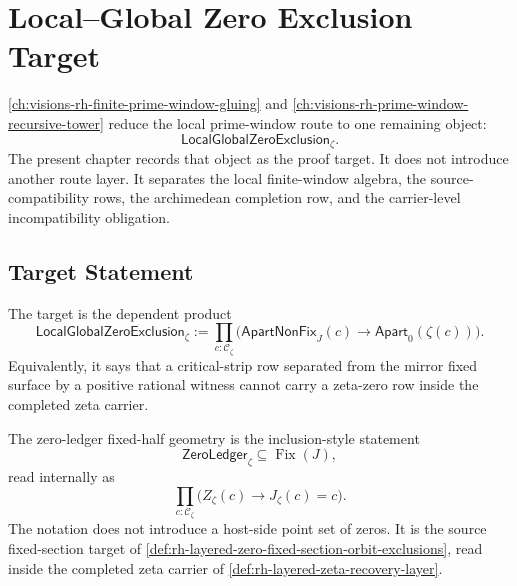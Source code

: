 \chapter{Local--Global Zero Exclusion Target}
\label{ch:visions-rh-local-global-zero-exclusion-target}

\autoref{ch:visions-rh-finite-prime-window-gluing} and
\autoref{ch:visions-rh-prime-window-recursive-tower} reduce the local
prime-window route to one remaining object:
$$
\mathsf{LocalGlobalZeroExclusion}_{\zeta}.
$$
The present chapter records that object as the proof target. It does not
introduce another route layer. It separates the local finite-window algebra,
the source-compatibility rows, the archimedean completion row, and the
carrier-level incompatibility obligation.

\section{Target Statement}
\label{sec:rh-local-global-zero-exclusion-target-statement}

\begin{definition}
\label{def:rh-local-global-zero-exclusion-target}
The target is the dependent product
$$
\mathsf{LocalGlobalZeroExclusion}_{\zeta}
:=
\prod_{c:\mathcal C_{\zeta}}
\bigl(
\mathsf{ApartNonFix}_{J}(c)
\to
\mathsf{Apart}_{0}(\zeta(c))
\bigr).
$$
Equivalently, it says that a critical-strip row separated from the mirror
fixed surface by a positive rational witness cannot carry a zeta-zero row
inside the completed zeta carrier.
\end{definition}

\begin{definition}
\label{def:rh-zero-ledger-fixed-half-geometry}
The zero-ledger fixed-half geometry is the inclusion-style statement
$$
\mathsf{ZeroLedger}_{\zeta}
\subseteq
\operatorname{Fix}(J),
$$
read internally as
$$
\prod_{c:\mathcal C_{\zeta}}
\bigl(
Z_{\zeta}(c)\to J_{\zeta}(c)=c
\bigr).
$$
The notation does not introduce a host-side point set of zeros. It is the
source fixed-section target of
\autoref{def:rh-layered-zero-fixed-section-orbit-exclusions}, read inside
the completed zeta carrier of \autoref{def:rh-layered-zeta-recovery-layer}.
\end{definition}


